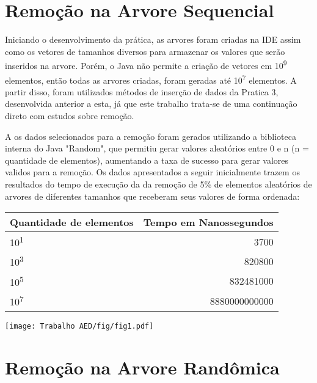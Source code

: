 \label{desenvolvimento}
\section{Remoção na Arvore Sequencial}
    Iniciando o desenvolvimento da prática, as arvores foram criadas na IDE assim como os vetores de tamanhos diversos para armazenar os valores que serão inseridos na arvore. Porém, o Java não permite a criação de vetores em 10\textsuperscript{9} elementos, então todas as arvores criadas, foram geradas até 10\textsuperscript{7} elementos. A partir disso, foram utilizados métodos de inserção de dados da Pratica 3, desenvolvida anterior a esta, já que este trabalho trata-se de uma continuação direto com estudos sobre remoção.
    
    A os dados selecionados para a remoção foram gerados utilizando a biblioteca interna do Java "Random", que permitiu gerar valores aleatórios entre 0 e n (n = quantidade de elementos), aumentando a taxa de sucesso para gerar valores validos para a remoção.
    Os dados apresentados a seguir inicialmente trazem os resultados do tempo de execução da da remoção de 5\% de elementos aleatórios de arvores de diferentes tamanhos que receberam seus valores de forma ordenada:
    
    \begin{center}
        \begin{tabular}{| l | r |}
            \hline
            Quantidade de elementos & Tempo em Nanossegundos\\
            \hline
            10\textsuperscript{1} & 3700\\
            10\textsuperscript{3} & 820800\\
            10\textsuperscript{5} & 832481000\\
            10\textsuperscript{7} & 8880000000000\\
            \hline
        \end{tabular}
    \end{center}

        \begin{center}
            \texttt{[image: Trabalho AED/fig/fig1.pdf]}
            \label{fig:Grafico 1}
        \end{center}

\section{Remoção na Arvore Randômica}

